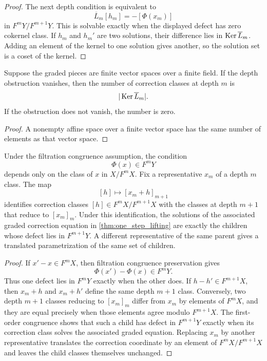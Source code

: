 \begin{proof}
The next depth condition is equivalent to
\[
\overline L_m[h_m]
=-[\Phi(x_m)]
\]
in $F^mY/F^{m+1}Y$.  This is solvable exactly when the displayed defect has zero cokernel class.  If $h_m$ and $h_m'$ are two solutions, their difference lies in $\operatorname{Ker}\overline L_m$.  Adding an element of the kernel to one solution gives another, so the solution set is a coset of the kernel.
\end{proof}

\begin{corollary}\label{cor:finite_branch_count}
Suppose the graded pieces are finite vector spaces over a finite field.  If the depth obstruction vanishes, then the number of correction classes at depth $m$ is
\[
|\operatorname{Ker}\overline L_m|.
\]
If the obstruction does not vanish, the number is zero.
\end{corollary}

\begin{proof}
A nonempty affine space over a finite vector space has the same number of elements as that vector space.
\end{proof}


\begin{lemma}\label{lem:well_defined_lift_classes}
Under the filtration congruence assumption, the condition
\[
\Phi(x)\in F^mY
\]
depends only on the class of $x$ in $X/F^mX$.  Fix a representative $x_m$ of a depth $m$ class.  The map
\[
[h]\longmapsto[x_m+h]_{m+1}
\]
identifies correction classes $[h]\in F^mX/F^{m+1}X$ with the classes at depth $m+1$ that reduce to $[x_m]_m$.  Under this identification, the solutions of the associated graded correction equation in \cref{thm:one_step_lifting} are exactly the children whose defect lies in $F^{m+1}Y$.  A different representative of the same parent gives a translated parametrization of the same set of children.
\end{lemma}

\begin{proof}
If $x'-x\in F^mX$, then filtration congruence preservation gives
\[
\Phi(x')-\Phi(x)\in F^mY.
\]
Thus one defect lies in $F^mY$ exactly when the other does.  If $h-h'\in F^{m+1}X$, then $x_m+h$ and $x_m+h'$ define the same depth $m+1$ class.  Conversely, two depth $m+1$ classes reducing to $[x_m]_m$ differ from $x_m$ by elements of $F^mX$, and they are equal precisely when those elements agree modulo $F^{m+1}X$.  The first-order congruence shows that such a child has defect in $F^{m+1}Y$ exactly when its correction class solves the associated graded equation.  Replacing $x_m$ by another representative translates the correction coordinate by an element of $F^mX/F^{m+1}X$ and leaves the child classes themselves unchanged.
\end{proof}

